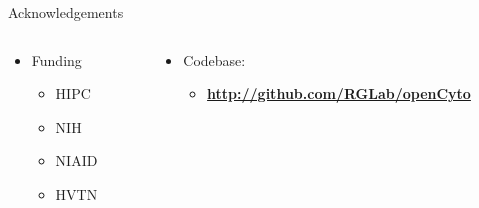 \documentclass[final,t]{beamer}
\begin{document}
\begin{frame}{}
\begin{columns}[t]
\begin{column}{.3\linewidth}

      \begin{block}{Acknowledgements}
        \vspace{-3ex}
       \begin{columns}[t]
  \begin{column}{.35\linewidth}
          \begin{itemize}
              \item \alert{Funding}
            \begin{itemize}
                \item HIPC
        \item NIH
        \item NIAID
        \item HVTN
            \end{itemize}
    \end{itemize}
  \end{column}
  \begin{column}{.65\linewidth}
          \begin{itemize}
              \item \alert{Codebase}:
            \begin{itemize}
                \item \textbf{\url{http://github.com/RGLab/openCyto}}
            \end{itemize}
    \end{itemize}
  \end{column}
  \end{columns}
      \end{block}

    \end{column}
  \end{columns}
\end{frame}
\end{document}
